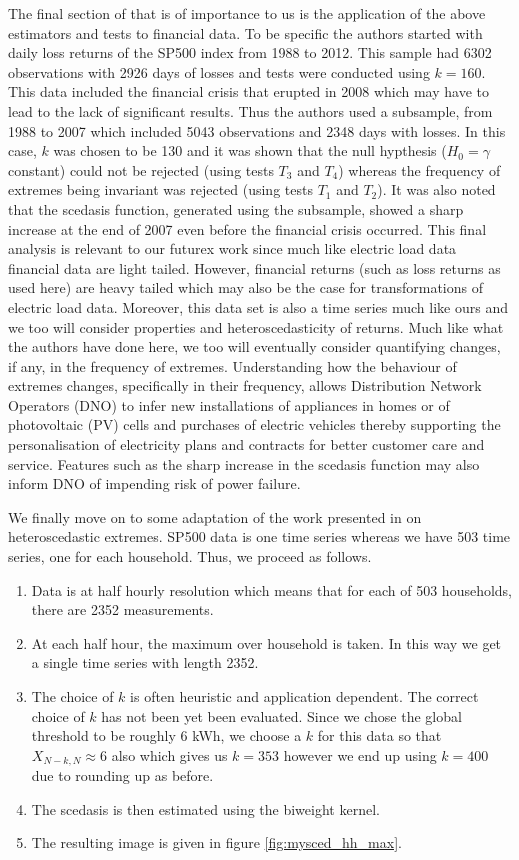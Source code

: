 The final section of \cite{einmahl16} that is of importance to us is the application of the above estimators and tests to financial data. To be specific the authors started with daily loss returns of the SP500 index from 1988 to 2012. This sample had 6302 observations with 2926 days of losses and tests were conducted using $k=160$. This data included the financial crisis that erupted in 2008 which may have to lead to the lack of significant results. Thus the authors used a subsample, from 1988 to 2007 which included 5043 observations and 2348 days with losses. In this case, $k$ was chosen to be 130 and it was shown that the null hypthesis ($H_0 = \gamma$ constant) could not be rejected (using tests $T_3$ and $T_4$) whereas the frequency of extremes being invariant was rejected (using tests $T_1$ and $T_2$).  It was also noted that the scedasis function, generated using the subsample, showed a sharp increase at the end of 2007 even before the financial crisis occurred. This final analysis is relevant to our futurex work since much like electric load data financial data are light tailed. However, financial returns (such as loss returns as used here) are heavy tailed which may also be the case for transformations of electric load data. Moreover, this data set is also a time series much like ours and we too will consider properties and heteroscedasticity of returns. Much like what the authors have done here, we too will eventually consider quantifying changes, if any, in the frequency of extremes. Understanding how the behaviour of extremes changes, specifically in their frequency, allows Distribution Network Operators (DNO) to infer new installations of appliances in homes or of photovoltaic (PV) cells and purchases of electric vehicles thereby supporting the personalisation of electricity plans and contracts for better customer care and service. Features such as the sharp increase in the scedasis function may also inform DNO of impending risk of power failure.


We finally move on to some adaptation of the work presented in \cite{einmahl16} on heteroscedastic extremes. SP500 data is one time series whereas we have 503 time series, one for each household. Thus, we proceed as follows.
\begin{enumerate}
\item Data is at half hourly resolution which means that for each of 503 households, there are 2352 measurements.
\item At each half hour, the maximum over household is taken. In this way we get a single time series with length 2352.
\item The choice of $k$ is often heuristic and application dependent. The correct choice of $k$ has not been yet been evaluated. Since we chose the global threshold to be roughly 6 kWh, we choose a $k$ for this data so that $X_{N-k,N} \approx 6$ also which gives us $k=353$ however we end up using $k=400$ due to rounding up as before. 
\item The scedasis is then estimated using the biweight kernel.
\item The resulting image is given in figure \ref{fig:mysced_hh_max}.
\end{enumerate}

